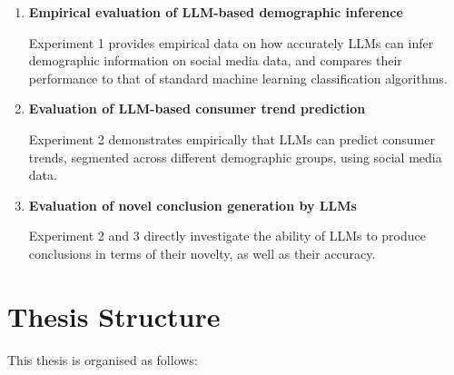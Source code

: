 \documentclass{report}
\begin{document}
\begin{enumerate}
    \item \textbf{Empirical evaluation of LLM-based demographic inference}

    Experiment 1 provides empirical data on how accurately LLMs can infer demographic information on social media data, and compares their performance to that of standard machine learning classification algorithms.

    \item \textbf{Evaluation of LLM-based consumer trend prediction}

    Experiment 2 demonstrates empirically that LLMs can predict consumer trends, segmented across different demographic groups, using social media data.

    \item \textbf{Evaluation of novel conclusion generation by LLMs}

    Experiment 2 and 3 directly investigate the ability of LLMs to produce conclusions in terms of their novelty, as well as their accuracy.
\end{enumerate}

\section{Thesis Structure}

This thesis is organised as follows:
\end{document}
